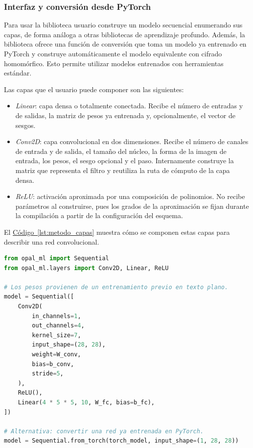 \subsubsection{Interfaz y conversión desde PyTorch}

Para usar la biblioteca usuario construye un modelo secuencial enumerando sus capas, de forma análoga a otras bibliotecas de aprendizaje profundo. Además, la biblioteca ofrece una función de conversión que toma un modelo ya entrenado en PyTorch y construye automáticamente el modelo equivalente con cifrado homomórfico. Esto permite utilizar modelos entrenados con herramientas estándar.

Las capas que el usuario puede componer son las siguientes:

\begin{itemize}
    \item \textit{Linear}: capa densa o totalmente conectada. Recibe el número de entradas y de salidas, la matriz de pesos ya entrenada y, opcionalmente, el vector de sesgos.
    \item \textit{Conv2D}: capa convolucional en dos dimensiones. Recibe el número de canales de entrada y de salida, el tamaño del núcleo, la forma de la imagen de entrada, los pesos, el sesgo opcional y el paso. Internamente construye la matriz que representa el filtro y reutiliza la ruta de cómputo de la capa densa.
    \item \textit{ReLU}: activación aproximada por una composición de polinomios. No recibe parámetros al construirse, pues los grados de la aproximación se fijan durante la compilación a partir de la configuración del esquema.
\end{itemize}

El \hyperref[lst:metodo_capas]{Código~\ref{lst:metodo_capas}} muestra cómo se componen estas capas para describir una red convolucional.

\begin{lstlisting}[language=Python,caption={Composición de capas con la clase Sequential.},label={lst:metodo_capas}]
from opal_ml import Sequential
from opal_ml.layers import Conv2D, Linear, ReLU

# Los pesos provienen de un entrenamiento previo en texto plano.
model = Sequential([
    Conv2D(
        in_channels=1,
        out_channels=4,
        kernel_size=7,
        input_shape=(28, 28),
        weight=W_conv,
        bias=b_conv,
        stride=5,
    ),
    ReLU(),
    Linear(4 * 5 * 5, 10, W_fc, bias=b_fc),
])

# Alternativa: convertir una red ya entrenada en PyTorch.
model = Sequential.from_torch(torch_model, input_shape=(1, 28, 28))
\end{lstlisting}

